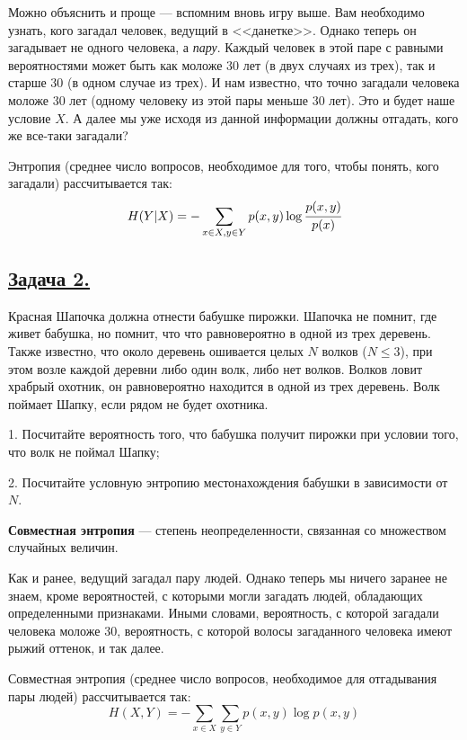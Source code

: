 Можно объяснить и проще --- вспомним вновь игру выше. Вам необходимо узнать, кого загадал человек, ведущий в <<данетке>>. Однако теперь он загадывает не одного человека, а \textit{пару}. Каждый человек в этой паре с равными вероятностями может быть как моложе 30 лет (в двух случаях из трех), так и старше 30 (в одном случае из трех). И нам известно, что точно загадали человека моложе 30 лет (одному человеку из этой пары меньше 30 лет). Это и будет наше условие $X$. А далее мы уже исходя из данной информации должны отгадать, кого же все-таки загадали?

Энтропия (среднее число вопросов, необходимое для того, чтобы понять, кого загадали) рассчитывается так:
\[H(Y|X)=-\sum\limits_{x\in X, y\in Y} p(x, y)\log \cfrac{p(x, y)}{p(x)} \]

\subsection*{\hyperref[sec:sol_problem2]{Задача 2.}}\label{sec:problem2} Красная Шапочка должна отнести бабушке пирожки. Шапочка не помнит, где живет бабушка, но помнит, что что равновероятно в одной из трех деревень. Также известно, что около деревень ошивается целых $N$ волков ($N\leqslant3$), при этом возле каждой деревни либо один волк, либо нет волков. Волков ловит храбрый охотник, он равновероятно находится в одной из трех деревень. Волк поймает Шапку, если рядом не будет охотника.

1. Посчитайте вероятность того, что бабушка получит пирожки при условии того, что волк не поймал Шапку; 

2. Посчитайте условную энтропию местонахождения бабушки в зависимости от $N$.  
\\

\begin{siderules}
    \textbf{Совместная энтропия} --- степень неопределенности, связанная со множеством случайных величин.
\end{siderules}

Как и ранее, ведущий загадал пару людей. Однако теперь мы ничего заранее не знаем, кроме вероятностей, с которыми могли загадать людей, обладающих определенными признаками. Иными словами, вероятность, с которой загадали человека моложе 30, вероятность, с которой волосы загаданного человека имеют рыжий оттенок, и так далее.

Совместная энтропия (среднее число вопросов, необходимое для отгадывания пары людей) рассчитывается так:
\[H(X, Y)=-\sum\limits_{x\in X}\sum\limits_{y\in Y} p(x, y)\log p(x ,y) \]

